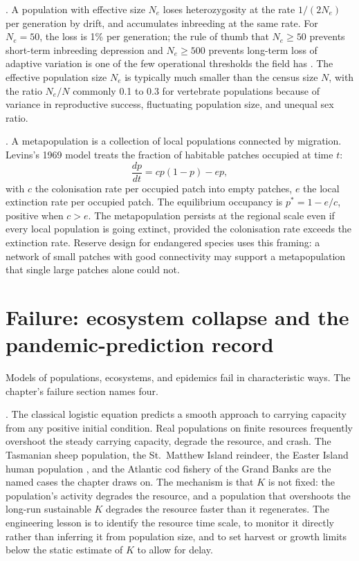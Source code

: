 . A population with effective size $N_e$
loses heterozygosity at the rate $1/(2 N_e)$ per generation by drift,
and accumulates inbreeding at the same rate. For $N_e = 50$, the
loss is 1\% per generation; the rule of thumb that $N_e \geq 50$
prevents short-term inbreeding depression and $N_e \geq 500$
prevents long-term loss of adaptive variation is one of the few
operational thresholds the field has \cite[ch.~7]{text:v6c08-caughley-conservation}.
The effective population size $N_e$ is typically much smaller than
the census size $N$, with the ratio $N_e/N$ commonly 0.1 to 0.3 for
vertebrate populations because of variance in reproductive success,
fluctuating population size, and unequal sex ratio.

. A metapopulation is a
collection of local populations connected by migration. Levins's
1969 model \cite[pp.~237--240]{paper:v6c08-levins-1969-metapopulation}
treats the fraction of habitable patches occupied at time $t$:
\[
\frac{dp}{dt} = c p (1 - p) - e p,
\]
with $c$ the colonisation rate per occupied patch into empty
patches, $e$ the local extinction rate per occupied patch. The
equilibrium occupancy is $p^* = 1 - e/c$, positive when $c > e$. The
metapopulation persists at the regional scale even if every local
population is going extinct, provided the colonisation rate exceeds
the extinction rate. Reserve design for endangered species uses
this framing: a network of small patches with good connectivity may
support a metapopulation that single large patches alone could not.

\section{Failure: ecosystem collapse and the pandemic-prediction record}

Models of populations, ecosystems, and epidemics fail in
characteristic ways. The chapter's failure section names four.

. The
classical logistic equation predicts a smooth approach to carrying
capacity from any positive initial condition. Real populations on
finite resources frequently overshoot the steady carrying capacity,
degrade the resource, and crash. The Tasmanian sheep population, the
St.\ Matthew Island reindeer, the Easter Island human population
\cite[chs.~2--3]{text:v6c08-diamond-collapse}, and the Atlantic cod
fishery of the Grand Banks \cite[ch.~9]{text:v6c08-kurlansky-cod} are the
named cases the chapter draws on. The mechanism is that $K$ is not
fixed: the population's activity degrades the resource, and a
population that overshoots the long-run sustainable $K$ degrades the
resource faster than it regenerates. The engineering lesson is to
identify the resource time scale, to monitor it directly rather than
inferring it from population size, and to set harvest or growth
limits below the static estimate of $K$ to allow for delay.


